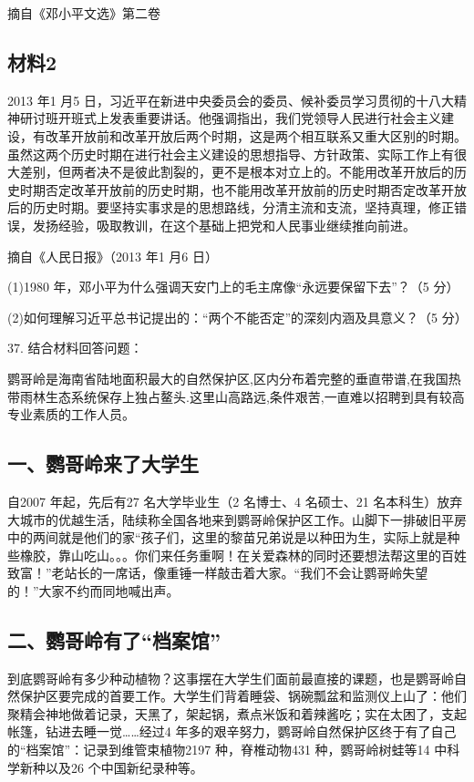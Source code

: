 \documentclass[UTF8,11pt]{ctexart}
\begin{document}
摘自《邓小平文选》第二卷

\subsection*{材料2}

2013 年1 月5 日，习近平在新进中央委员会的委员、候补委员学习贯彻的十八大精神研讨班开班式上发表重要讲话。他强调指出，我们党领导人民进行社会主义建设，有改革开放前和改革开放后两个时期，这是两个相互联系又重大区别的时期。虽然这两个历史时期在进行社会主义建设的思想指导、方针政策、实际工作上有很大差别，但两者决不是彼此割裂的，更不是根本对立上的。不能用改革开放后的历史时期否定改革开放前的历史时期，也不能用改革开放前的历史时期否定改革开放后的历史时期。要坚持实事求是的思想路线，分清主流和支流，坚持真理，修正错误，发扬经验，吸取教训，在这个基础上把党和人民事业继续推向前进。

摘自《人民日报》（2013 年1 月6 日）

(1)1980 年，邓小平为什么强调天安门上的毛主席像“永远要保留下去”？（5 分）


(2)如何理解习近平总书记提出的：“两个不能否定”的深刻内涵及具意义？（5 分）


37. 结合材料回答问题：

鹦哥岭是海南省陆地面积最大的自然保护区,区内分布着完整的垂直带谱,在我国热带雨林生态系统保存上独占鳌头.这里山高路远,条件艰苦,一直难以招聘到具有较高专业素质的工作人员。

\subsection*{一、鹦哥岭来了大学生}

自2007 年起，先后有27 名大学毕业生（2 名博士、4 名硕士、21 名本科生）放弃大城市的优越生活，陆续称全国各地来到鹦哥岭保护区工作。山脚下一排破旧平房中的两间就是他们的家“孩子们，这里的黎苗兄弟说是以种田为生，实际上就是种些橡胶，靠山吃山。。。你们来任务重啊！在关爱森林的同时还要想法帮这里的百姓致富！”老站长的一席话，像重锤一样敲击着大家。“我们不会让鹦哥岭失望的！”大家不约而同地喊出声。


\subsection*{二、鹦哥岭有了“档案馆”}

到底鹦哥岭有多少种动植物？这事摆在大学生们面前最直接的课题，也是鹦哥岭自然保护区要完成的首要工作。大学生们背着睡袋、锅碗瓢盆和监测仪上山了：他们聚精会神地做着记录，天黑了，架起锅，煮点米饭和着辣酱吃；实在太困了，支起帐篷，钻进去睡一觉……经过4 年多的艰辛努力，鹦哥岭自然保护区终于有了自己的“档案馆”：记录到维管束植物2197 种，脊椎动物431 种，鹦哥岭树蛙等14 中科学新种以及26 个中国新纪录种等。
\end{document}
